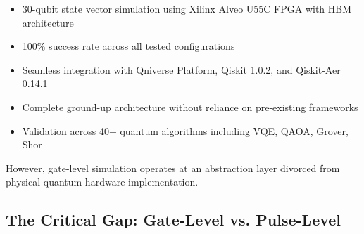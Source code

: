 \documentclass[12pt,a4paper]{article}
\begin{document}
\begin{itemize}[noitemsep]
    \item 30-qubit state vector simulation using Xilinx Alveo U55C FPGA with HBM architecture
    \item 100\% success rate across all tested configurations
    \item Seamless integration with Qniverse Platform, Qiskit 1.0.2, and Qiskit-Aer 0.14.1
    \item Complete ground-up architecture without reliance on pre-existing frameworks
    \item Validation across 40+ quantum algorithms including VQE, QAOA, Grover, Shor
\end{itemize}

However, gate-level simulation operates at an abstraction layer divorced from physical quantum hardware implementation.

\subsection{The Critical Gap: Gate-Level vs. Pulse-Level}
\end{document}
